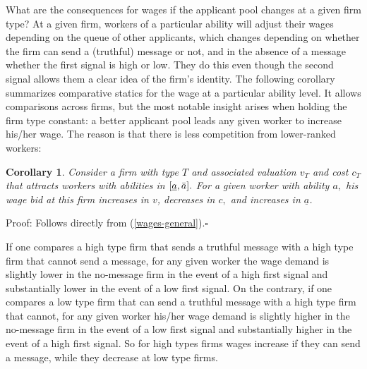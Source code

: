 \documentclass[12pt]{article}
\newtheorem{corollary}[theorem]{Corollary}
\begin{document}
What are the consequences for wages if the applicant pool changes at a given firm type? At a given firm, workers of a particular ability will adjust their wages depending on the queue of other applicants, which changes depending on whether the firm can send a (truthful) message or not, and in the absence of a message whether the first signal is high or low. They do this even though the second signal allows them a clear idea of the firm's identity. The following corollary summarizes comparative statics for the wage at a particular ability level. It allows comparisons across firms, but the most notable insight arises when holding the firm type constant: a better applicant pool leads any given worker to increase his/her wage. The reason is that there is less competition from lower-ranked workers: 






\begin{corollary}
\label{corollary 2}Consider a firm with type $T$ and associated valuation $%
v_{T}$ and cost $c_{T}$ that attracts workers with abilities in $[\underline{%
a},\bar{a}].$ For a given worker with ability $a,$ his wage bid at this firm
increases in $v$, decreases in $c,$ and increases in $\underline{a}$.
\end{corollary}

Proof: Follows directly from (\ref{wages-general}).$\square $

\bigskip

If one compares a high type firm that sends a truthful message with a high type
firm that cannot send a message, for any given worker the wage demand is
slightly lower in the no-message firm in the event of a high first signal
and substantially lower in the event of a low first signal. On the contrary,
if one compares a low type firm that can send a truthful message with a high
type firm that cannot, for any given worker his/her wage demand is slightly
higher in the no-message firm in the event of a low first signal and
substantially higher in the event of a high first signal. So for high types firms
wages increase if they can send a message, while they decrease at low type
firms. \bigskip
\end{document}
